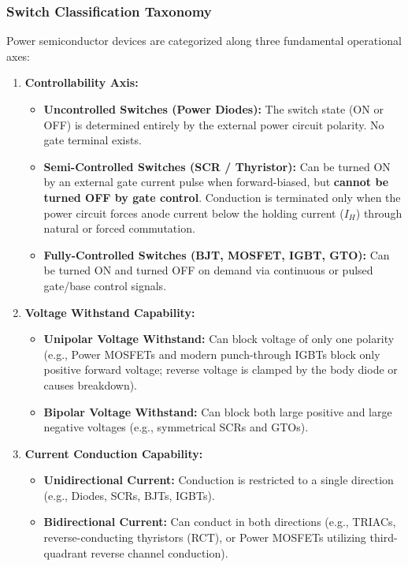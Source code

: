 \documentclass[11pt,a4paper]{article}
\begin{document}
\subsubsection{Switch Classification Taxonomy}
Power semiconductor devices are categorized along three fundamental operational axes:

\begin{enumerate}[leftmargin=*]
  \item \textbf{Controllability Axis:}
    \begin{itemize}
      \item \textbf{Uncontrolled Switches (Power Diodes):} The switch state (ON or OFF) is determined entirely by the external power circuit polarity. No gate terminal exists.
      \item \textbf{Semi-Controlled Switches (SCR / Thyristor):} Can be turned ON by an external gate current pulse when forward-biased, but \textbf{cannot be turned OFF by gate control}. Conduction is terminated only when the power circuit forces anode current below the holding current ($I_H$) through natural or forced commutation.
      \item \textbf{Fully-Controlled Switches (BJT, MOSFET, IGBT, GTO):} Can be turned ON and turned OFF on demand via continuous or pulsed gate/base control signals.
    \end{itemize}
  \item \textbf{Voltage Withstand Capability:}
    \begin{itemize}
      \item \textbf{Unipolar Voltage Withstand:} Can block voltage of only one polarity (e.g., Power MOSFETs and modern punch-through IGBTs block only positive forward voltage; reverse voltage is clamped by the body diode or causes breakdown).
      \item \textbf{Bipolar Voltage Withstand:} Can block both large positive and large negative voltages (e.g., symmetrical SCRs and GTOs).
    \end{itemize}
  \item \textbf{Current Conduction Capability:}
    \begin{itemize}
      \item \textbf{Unidirectional Current:} Conduction is restricted to a single direction (e.g., Diodes, SCRs, BJTs, IGBTs).
      \item \textbf{Bidirectional Current:} Can conduct in both directions (e.g., TRIACs, reverse-conducting thyristors (RCT), or Power MOSFETs utilizing third-quadrant reverse channel conduction).
    \end{itemize}
\end{enumerate}
\end{document}
